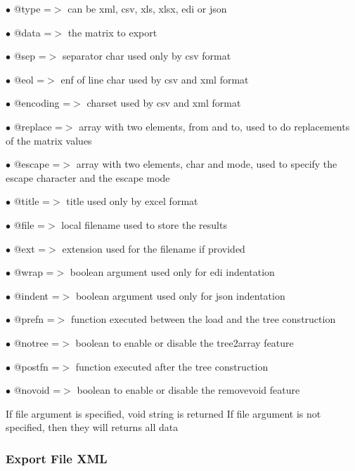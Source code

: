 \documentclass[a4paper]{article}
\begin{document}
\begin{compactitem}
\item[\color{myblue}$\bullet$] @type     =$>$ can be xml, csv, xls, xlsx, edi or json
\item[\color{myblue}$\bullet$] @data     =$>$ the matrix to export
\item[\color{myblue}$\bullet$] @sep      =$>$ separator char used only by csv format
\item[\color{myblue}$\bullet$] @eol      =$>$ enf of line char used by csv and xml format
\item[\color{myblue}$\bullet$] @encoding =$>$ charset used by csv and xml format
\item[\color{myblue}$\bullet$] @replace  =$>$ array with two elements, from and to, used to do replacements of the matrix values
\item[\color{myblue}$\bullet$] @escape   =$>$ array with two elements, char and mode, used to specify the escape character and the
             escape mode
\item[\color{myblue}$\bullet$] @title    =$>$ title used only by excel format
\item[\color{myblue}$\bullet$] @file     =$>$ local filename used to store the results
\item[\color{myblue}$\bullet$] @ext      =$>$ extension used for the filename if provided
\item[\color{myblue}$\bullet$] @wrap     =$>$ boolean argument used only for edi indentation
\item[\color{myblue}$\bullet$] @indent   =$>$ boolean argument used only for json indentation
\item[\color{myblue}$\bullet$] @prefn    =$>$ function executed between the load and the tree construction
\item[\color{myblue}$\bullet$] @notree   =$>$ boolean to enable or disable the tree2array feature
\item[\color{myblue}$\bullet$] @postfn   =$>$ function executed after the tree construction
\item[\color{myblue}$\bullet$] @novoid   =$>$ boolean to enable or disable the removevoid feature
\end{compactitem}

If file argument is specified, void string is returned
If file argument is not specified, then they will returns all data

\hypertarget{toc440}{}
\subsubsection{Export File XML}
\end{document}

